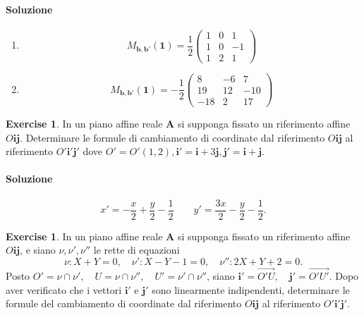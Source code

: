 \documentclass{article}
\theoremstyle{plain}
\theoremstyle{definition}
\newtheorem{xca}[exmp]{Exercise}
\theoremstyle{remark}
\begin{document}
\paragraph{Soluzione}
\begin{enumerate}
    \item \[M_{\mathbf{b},\mathbf{b}'}(\mathbf{1})=\frac{1}{2}
    \begin{pmatrix}
         1&0&1\\
         1&0&-1\\
         1&2&1
    \end{pmatrix} 
    \]
    \item \[M_{\mathbf{b},\mathbf{b}'}(\mathbf{1})=-\frac{1}{2}
    \begin{pmatrix}
         8&-6&7\\
         19&12&-10\\
         -18&2&17
    \end{pmatrix} 
    \]
\end{enumerate}

\vspace{10pt}

\begin{bxthm}
\begin{xca}
    In un piano affine reale \( \mathbf{A} \) si supponga fissato un riferimento affine \( O\mathbf{ij} \). 
    Determinare le formule di cambiamento di coordinate dal riferimento \( O\mathbf{ij} \) al riferimento 
    \( O'\mathbf{i}'\mathbf{j}' \) 
    dove \( O' = O'(1,2), \mathbf{i}' = \mathbf{i} + 3\mathbf{j}, \mathbf{j}' = \mathbf{i} + \mathbf{j} \).
\end{xca}
\end{bxthm}
\paragraph{Soluzione}
\[x'=-\dfrac{x}{2}+\dfrac{y}{2}-\dfrac{1}{2}\quad\quad y'=\dfrac{3x}{2}-\dfrac{y}{2}-\dfrac{1}{2}.\]

\vspace{10pt}

\begin{bxthm}
\begin{xca}
In un piano affine reale \( \mathbf{A} \) si supponga fissato un riferimento affine \( O\mathbf{ij} \), e siano 
\( \nu, \nu', \nu'' \) le rette di equazioni
\[
\nu: X + Y = 0, \quad \nu': X - Y - 1 = 0, \quad \nu'': 2X + Y + 2 = 0.
\]
Posto \( O' = \nu \cap \nu', \quad U = \nu \cap \nu'', \quad U' = \nu' \cap \nu'' \), 
siano \( \mathbf{i}' = \overrightarrow{O'U}, \quad \mathbf{j}' = \overrightarrow{O'U'} \). 
Dopo aver verificato che i vettori \( \mathbf{i}' \) e \( \mathbf{j}' \) sono linearmente indipendenti, determinare le formule 
del cambiamento di coordinate dal riferimento \( O\mathbf{ij} \) al riferimento \( O'\mathbf{i}'\mathbf{j}'\).
\end{xca}
\end{bxthm}
\end{document}
